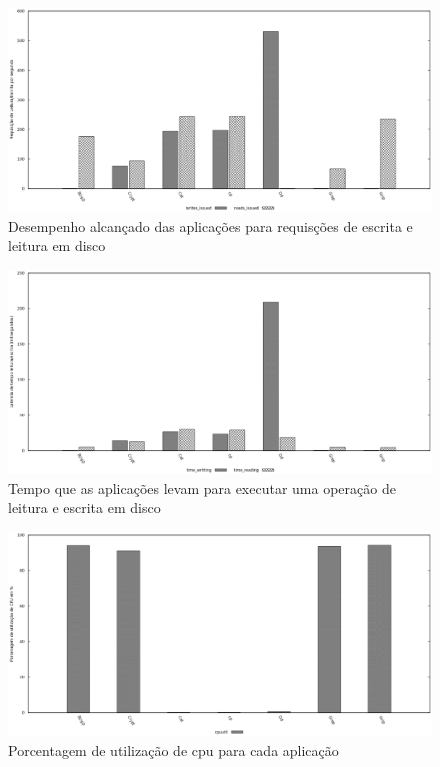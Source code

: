 \begin{figure}[!h]
\centering
\includegraphics [keepaspectratio=true,scale=0.4]{graficos/exp_3_read_write.eps}
\caption{Desempenho alcançado das aplicações para requisções de escrita e leitura em disco}
\label{disk_operations}
\end{figure} 

\begin{figure}[!h]
\centering
\includegraphics [keepaspectratio=true,scale=0.4]{graficos/exp2_latency.eps}
\caption{Tempo que as aplicações levam para executar uma operação de leitura e escrita em disco}
\label{latency_disk}
\end{figure}

\begin{figure}[!h]
\centering
\includegraphics [keepaspectratio=true,scale=0.4]{graficos/exp_3_cpu.eps}
\caption{Porcentagem de utilização de cpu para cada aplicação}
\label{cpu_util}
\end{figure}  

